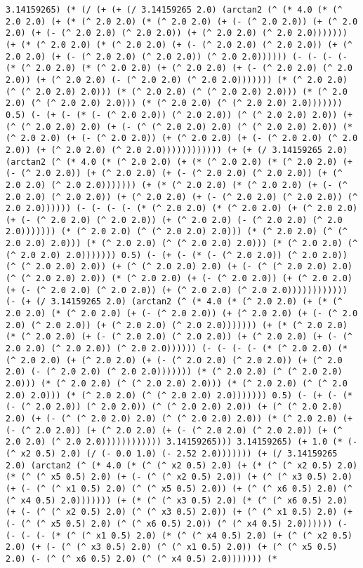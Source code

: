 \begin{lstlisting}
3.14159265) (* (/ (+ (+ (/ 3.14159265 2.0) (arctan2 (^ (* 4.0 (* (^ 2.0 2.0) (+ (* (^ 2.0 2.0) (* (^ 2.0 2.0) (+ (- (^ 2.0 2.0)) (+ (^ 2.0 2.0) (+ (- (^ 2.0 2.0) (^ 2.0 2.0)) (+ (^ 2.0 2.0) (^ 2.0 2.0))))))) (+ (* (^ 2.0 2.0) (* (^ 2.0 2.0) (+ (- (^ 2.0 2.0) (^ 2.0 2.0)) (+ (^ 2.0 2.0) (+ (- (^ 2.0 2.0) (^ 2.0 2.0)) (^ 2.0 2.0)))))) (- (- (- (- (* (^ 2.0 2.0) (* (^ 2.0 2.0) (+ (^ 2.0 2.0) (+ (- (^ 2.0 2.0) (^ 2.0 2.0)) (+ (^ 2.0 2.0) (- (^ 2.0 2.0) (^ 2.0 2.0))))))) (* (^ 2.0 2.0) (^ (^ 2.0 2.0) 2.0))) (* (^ 2.0 2.0) (^ (^ 2.0 2.0) 2.0))) (* (^ 2.0 2.0) (^ (^ 2.0 2.0) 2.0))) (* (^ 2.0 2.0) (^ (^ 2.0 2.0) 2.0))))))) 0.5) (- (+ (- (* (- (^ 2.0 2.0)) (^ 2.0 2.0)) (^ (^ 2.0 2.0) 2.0)) (+ (^ (^ 2.0 2.0) 2.0) (+ (- (^ (^ 2.0 2.0) 2.0) (^ (^ 2.0 2.0) 2.0)) (* (^ 2.0 2.0) (+ (- (^ 2.0 2.0)) (+ (^ 2.0 2.0) (+ (- (^ 2.0 2.0) (^ 2.0 2.0)) (+ (^ 2.0 2.0) (^ 2.0 2.0)))))))))))) (+ (+ (/ 3.14159265 2.0) (arctan2 (^ (* 4.0 (* (^ 2.0 2.0) (+ (* (^ 2.0 2.0) (* (^ 2.0 2.0) (+ (- (^ 2.0 2.0)) (+ (^ 2.0 2.0) (+ (- (^ 2.0 2.0) (^ 2.0 2.0)) (+ (^ 2.0 2.0) (^ 2.0 2.0))))))) (+ (* (^ 2.0 2.0) (* (^ 2.0 2.0) (+ (- (^ 2.0 2.0) (^ 2.0 2.0)) (+ (^ 2.0 2.0) (+ (- (^ 2.0 2.0) (^ 2.0 2.0)) (^ 2.0 2.0)))))) (- (- (- (- (* (^ 2.0 2.0) (* (^ 2.0 2.0) (+ (^ 2.0 2.0) (+ (- (^ 2.0 2.0) (^ 2.0 2.0)) (+ (^ 2.0 2.0) (- (^ 2.0 2.0) (^ 2.0 2.0))))))) (* (^ 2.0 2.0) (^ (^ 2.0 2.0) 2.0))) (* (^ 2.0 2.0) (^ (^ 2.0 2.0) 2.0))) (* (^ 2.0 2.0) (^ (^ 2.0 2.0) 2.0))) (* (^ 2.0 2.0) (^ (^ 2.0 2.0) 2.0))))))) 0.5) (- (+ (- (* (- (^ 2.0 2.0)) (^ 2.0 2.0)) (^ (^ 2.0 2.0) 2.0)) (+ (^ (^ 2.0 2.0) 2.0) (+ (- (^ (^ 2.0 2.0) 2.0) (^ (^ 2.0 2.0) 2.0)) (* (^ 2.0 2.0) (+ (- (^ 2.0 2.0)) (+ (^ 2.0 2.0) (+ (- (^ 2.0 2.0) (^ 2.0 2.0)) (+ (^ 2.0 2.0) (^ 2.0 2.0)))))))))))) (- (+ (/ 3.14159265 2.0) (arctan2 (^ (* 4.0 (* (^ 2.0 2.0) (+ (* (^ 2.0 2.0) (* (^ 2.0 2.0) (+ (- (^ 2.0 2.0)) (+ (^ 2.0 2.0) (+ (- (^ 2.0 2.0) (^ 2.0 2.0)) (+ (^ 2.0 2.0) (^ 2.0 2.0))))))) (+ (* (^ 2.0 2.0) (* (^ 2.0 2.0) (+ (- (^ 2.0 2.0) (^ 2.0 2.0)) (+ (^ 2.0 2.0) (+ (- (^ 2.0 2.0) (^ 2.0 2.0)) (^ 2.0 2.0)))))) (- (- (- (- (* (^ 2.0 2.0) (* (^ 2.0 2.0) (+ (^ 2.0 2.0) (+ (- (^ 2.0 2.0) (^ 2.0 2.0)) (+ (^ 2.0 2.0) (- (^ 2.0 2.0) (^ 2.0 2.0))))))) (* (^ 2.0 2.0) (^ (^ 2.0 2.0) 2.0))) (* (^ 2.0 2.0) (^ (^ 2.0 2.0) 2.0))) (* (^ 2.0 2.0) (^ (^ 2.0 2.0) 2.0))) (* (^ 2.0 2.0) (^ (^ 2.0 2.0) 2.0))))))) 0.5) (- (+ (- (* (- (^ 2.0 2.0)) (^ 2.0 2.0)) (^ (^ 2.0 2.0) 2.0)) (+ (^ (^ 2.0 2.0) 2.0) (+ (- (^ (^ 2.0 2.0) 2.0) (^ (^ 2.0 2.0) 2.0)) (* (^ 2.0 2.0) (+ (- (^ 2.0 2.0)) (+ (^ 2.0 2.0) (+ (- (^ 2.0 2.0) (^ 2.0 2.0)) (+ (^ 2.0 2.0) (^ 2.0 2.0)))))))))))) 3.14159265))) 3.14159265) (+ 1.0 (* (- (^ x2 0.5) 2.0) (/ (- 0.0 1.0) (- 2.52 2.0))))))) (+ (/ 3.14159265 2.0) (arctan2 (^ (* 4.0 (* (^ (^ x2 0.5) 2.0) (+ (* (^ (^ x2 0.5) 2.0) (* (^ (^ x5 0.5) 2.0) (+ (- (^ (^ x2 0.5) 2.0)) (+ (^ (^ x3 0.5) 2.0) (+ (- (^ (^ x1 0.5) 2.0) (^ (^ x5 0.5) 2.0)) (+ (^ (^ x6 0.5) 2.0) (^ (^ x4 0.5) 2.0))))))) (+ (* (^ (^ x3 0.5) 2.0) (* (^ (^ x6 0.5) 2.0) (+ (- (^ (^ x2 0.5) 2.0) (^ (^ x3 0.5) 2.0)) (+ (^ (^ x1 0.5) 2.0) (+ (- (^ (^ x5 0.5) 2.0) (^ (^ x6 0.5) 2.0)) (^ (^ x4 0.5) 2.0)))))) (- (- (- (- (* (^ (^ x1 0.5) 2.0) (* (^ (^ x4 0.5) 2.0) (+ (^ (^ x2 0.5) 2.0) (+ (- (^ (^ x3 0.5) 2.0) (^ (^ x1 0.5) 2.0)) (+ (^ (^ x5 0.5) 2.0) (- (^ (^ x6 0.5) 2.0) (^ (^ x4 0.5) 2.0))))))) (* 
\end{lstlisting}
